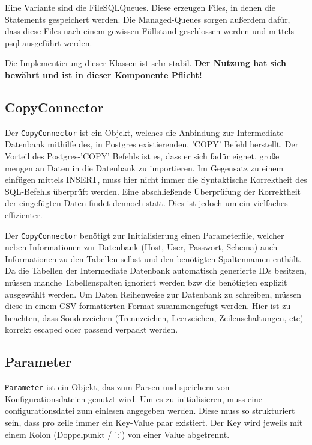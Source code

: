 Eine Variante sind die FileSQLQueues. Diese erzeugen Files, in denen die Statements gespeichert
werden. Die Managed-Queues sorgen außerdem dafür, dass diese Files nach einem gewissen Füllstand
geschlossen werden und mittels psql ausgeführt werden. 

Die Implementierung dieser Klassen ist sehr stabil. {\bf Der Nutzung hat sich bewährt und ist in
dieser Komponente Pflicht!}

\subsection{CopyConnector}
Der {\tt CopyConnector} ist ein Objekt, welches die Anbindung zur Intermediate Datenbank mithilfe des, in Postgres existierenden, 'COPY' Befehl herstellt.
Der Vorteil des Postgres-'COPY' Befehls ist es, dass er sich fadür eignet, große mengen an Daten in die Datenbank zu importieren. Im Gegensatz zu einem einfügen mittels INSERT, muss hier nicht immer die Syntaktische Korrektheit des SQL-Befehls überprüft werden. Eine abschließende Überprüfung der Korrektheit der eingefügten Daten findet dennoch statt. Dies ist jedoch um ein vielfaches effizienter. 

Der {\tt CopyConnector} benötigt zur Initialisierung einen Parameterfile, welcher neben Informationen zur Datenbank (Host, User, Passwort, Schema) auch Informationen zu den Tabellen selbst und den benötigten Spaltennamen enthält. Da die Tabellen der Intermediate Datenbank automatisch generierte IDs besitzen, müssen manche Tabellenspalten ignoriert werden bzw die benötigten explizit ausgewählt werden.
Um Daten Reihenweise zur Datenbank zu schreiben, müssen diese in einem CSV formatierten Format zusammengefügt werden. Hier ist zu beachten, dass Sonderzeichen (Trennzeichen, Leerzeichen, Zeilenschaltungen, etc) korrekt escaped oder passend verpackt werden.

\subsection{Parameter}
{\tt Parameter} ist ein Objekt, das zum Parsen und speichern von Konfigurationsdateien genutzt wird. Um es zu initialisieren, muss eine configurationsdatei zum einlesen angegeben werden.
Diese muss so strukturiert sein, dass pro zeile immer ein Key-Value paar existiert.
Der Key wird jeweils mit einem Kolon (Doppelpunkt / ':') von einer Value abgetrennt.

